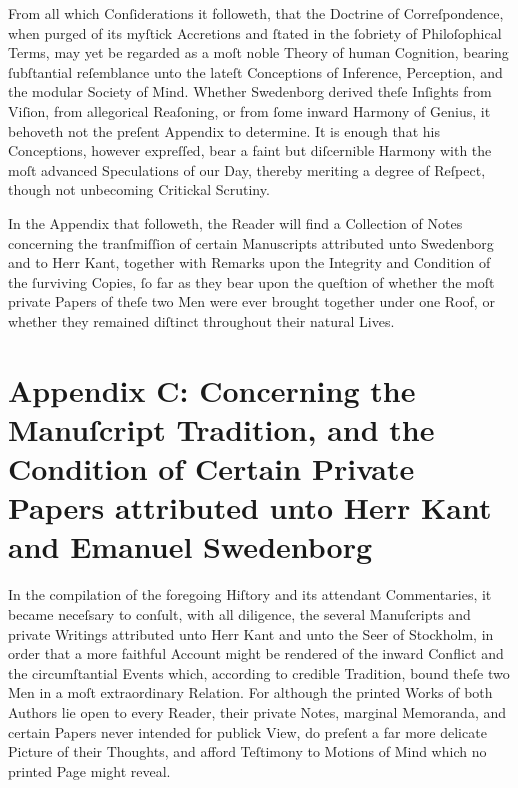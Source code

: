 \documentclass[12pt]{book}
\begin{document}
\vspace{1em}

\noindent
From all which Conſiderations it followeth, that the Doctrine of Correſpondence, when purged of its myſtick Accretions and ſtated in the ſobriety of Philoſophical Terms, may yet be regarded as a moſt noble Theory of human Cognition, bearing ſubſtantial reſemblance unto the lateſt Conceptions of Inference, Perception, and the modular Society of Mind. Whether Swedenborg derived theſe Inſights from Viſion, from allegorical Reaſoning, or from ſome inward Harmony of Genius, it behoveth not the preſent Appendix to determine. It is enough that his Conceptions, however expreſſed, bear a faint but diſcernible Harmony with the moſt advanced Speculations of our Day, thereby meriting a degree of Reſpect, though not unbecoming Critickal Scrutiny.

\vspace{1.2em}

\noindent
In the Appendix that followeth, the Reader will find a Collection of Notes concerning the tranſmiſſion of certain Manuscripts attributed unto Swedenborg and to Herr Kant, together with Remarks upon the Integrity and Condition of the ſurviving Copies, ſo far as they bear upon the queſtion of whether the moſt private Papers of theſe two Men were ever brought together under one Roof, or whether they remained diſtinct throughout their natural Lives.

\newpage
\section*{Appendix C: Concerning the Manuſcript Tradition, and the Condition of Certain Private Papers attributed unto Herr Kant and Emanuel Swedenborg}


\noindent
In the compilation of the foregoing Hiſtory and its attendant Commentaries, it became neceſsary to conſult, with all diligence, the several Manuſcripts and private Writings attributed unto Herr Kant and unto the Seer of Stockholm, in order that a more faithful Account might be rendered of the inward Conflict and the circumſtantial Events which, according to credible Tradition, bound theſe two Men in a moſt extraordinary Relation. For although the printed Works of both Authors lie open to every Reader, their private Notes, marginal Memoranda, and certain Papers never intended for publick View, do preſent a far more delicate Picture of their Thoughts, and afford Teſtimony to Motions of Mind which no printed Page might reveal.
\end{document}
